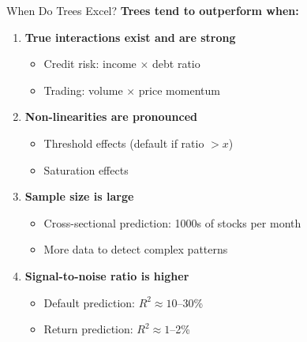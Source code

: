 \documentclass[10pt]{beamer}
\begin{document}
\begin{frame}{When Do Trees Excel?}
  \textbf{Trees tend to outperform when:}

  \vspace{0.5em}
  \begin{enumerate}
    \item \textbf{True interactions exist and are strong}
    \begin{itemize}
      \item Credit risk: income $\times$ debt ratio
      \item Trading: volume $\times$ price momentum
    \end{itemize}

    \vspace{0.3em}
    \item \textbf{Non-linearities are pronounced}
    \begin{itemize}
      \item Threshold effects (default if ratio $> x$)
      \item Saturation effects
    \end{itemize}

    \vspace{0.3em}
    \item \textbf{Sample size is large}
    \begin{itemize}
      \item Cross-sectional prediction: 1000s of stocks per month
      \item More data to detect complex patterns
    \end{itemize}

    \vspace{0.3em}
    \item \textbf{Signal-to-noise ratio is higher}
    \begin{itemize}
      \item Default prediction: $R^2 \approx 10$--30\%
      \item Return prediction: $R^2 \approx 1$--2\%
    \end{itemize}
  \end{enumerate}
\end{frame}

\end{document}
